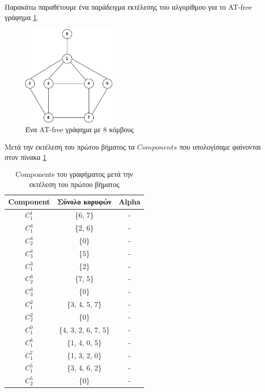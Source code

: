 Παρακάτω παραθέτουμε ένα παράδειγμα εκτέλεσης του αλγορίθμου για το AT-free γράφημα \ref{fig:at-free-graph-example}.

\begin{figure}[H]
	\centering
	\includegraphics[width=0.4\textwidth]{pictures/at-free-graph.png} 
	\caption{Ένα AT-free γράφημα με 8 κόμβους}
	\label{fig:at-free-graph-example}
\end{figure}

Μετά την εκτέλεση του πρώτου βήματος τα $Components$ που υπολογίσαμε φαίνονται στον πίνακα \ref{table:first-step-intependent-set} 

\begin{table}[H]
	
	\centering
	\caption{Components του γραφήματος μετά την εκτέλεση του πρώτου βήματος}
	\begin{tabular}{|c|c|c|}
		\hline
		\textbf{Component} & \textbf{Σύνολο κορυφών} & \textbf{Alpha} \\
		\hline
		$C_1^1$ & \quad \{6, 7\} & - \\
		$C_1^4$ & \quad \{2, 6\} & - \\
		$C_2^4$ & \quad \{0\} & - \\
		$C_3^4$ & \quad \{5\} & - \\
		$C_1^3$ & \quad \{2\} & - \\
		$C_2^3$ & \quad \{7, 5\} & - \\
		$C_3^3$ & \quad \{0\} & - \\
		$C_1^2$ & \quad \{3, 4, 5, 7\} & - \\
		$C_2^2$ & \quad \{0\} & - \\
		$C_1^0$ & \quad \{4, 3, 2, 6, 7, 5\} & - \\
		$C_1^6$ & \quad \{1, 4, 0, 5\} & - \\
		$C_1^7$ & \quad \{1, 3, 2, 0\} & - \\
		$C_1^5$ & \quad \{3, 4, 6, 2\} & - \\
		$C_2^5$ & \quad \{0\} & - \\		
		\hline
	\end{tabular}
\label{table:first-step-intependent-set}
\end{table}

